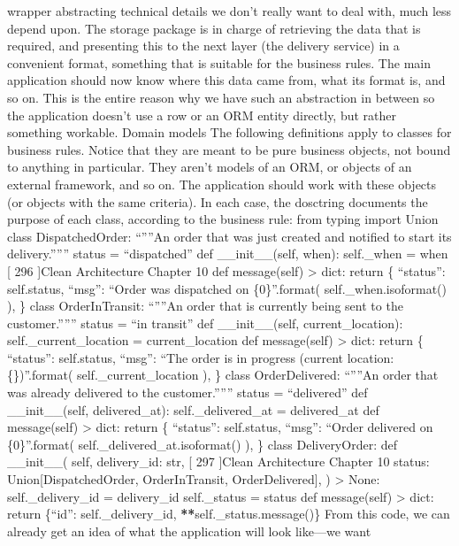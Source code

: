 \documentclass[a4paper,10pt,english]{sphinxmanual}
\begin{document}
wrapper abstracting technical details we don’t really want to deal with, much less depend
upon.
The storage package is in charge of retrieving the data that is required, and presenting
this to the next layer (the delivery service) in a convenient format, something that is suitable
for the business rules. The main application should now know where this data came from,
what its format is, and so on. This is the entire reason why we have such an abstraction in
between so the application doesn’t use a row or an ORM entity directly, but rather
something workable.
Domain models
The following definitions apply to classes for business rules. Notice that they are meant to
be pure business objects, not bound to anything in particular. They aren’t models of an
ORM, or objects of an external framework, and so on. The application should work with
these objects (or objects with the same criteria).
In each case, the dosctring documents the purpose of each class, according to the business
rule:
from typing import Union
class DispatchedOrder:
“””An order that was just created and notified to start its
delivery.”””
status = “dispatched”
def \_\_init\_\_(self, when):
self.\_when = when
{[} 296 {]}Clean Architecture
Chapter 10
def message(self) \sphinxhyphen{}\textgreater{} dict:
return \{
“status”: self.status,
“msg”: “Order was dispatched on \{0\}”.format(
self.\_when.isoformat()
),
\}
class OrderInTransit:
“””An order that is currently being sent to the customer.”””
status = “in transit”
def \_\_init\_\_(self, current\_location):
self.\_current\_location = current\_location
def message(self) \sphinxhyphen{}\textgreater{} dict:
return \{
“status”: self.status,
“msg”: “The order is in progress (current location:
\{\})”.format(
self.\_current\_location
),
\}
class OrderDelivered:
“””An order that was already delivered to the customer.”””
status = “delivered”
def \_\_init\_\_(self, delivered\_at):
self.\_delivered\_at = delivered\_at
def message(self) \sphinxhyphen{}\textgreater{} dict:
return \{
“status”: self.status,
“msg”: “Order delivered on \{0\}”.format(
self.\_delivered\_at.isoformat()
),
\}
class DeliveryOrder:
def \_\_init\_\_(
self,
delivery\_id: str,
{[} 297 {]}Clean Architecture
Chapter 10
status: Union{[}DispatchedOrder, OrderInTransit, OrderDelivered{]},
) \sphinxhyphen{}\textgreater{} None:
self.\_delivery\_id = delivery\_id
self.\_status = status
def message(self) \sphinxhyphen{}\textgreater{} dict:
return \{“id”: self.\_delivery\_id, {\color{red}\bfseries{}**}self.\_status.message()\}
From this code, we can already get an idea of what the application will look like—we want
\end{document}
